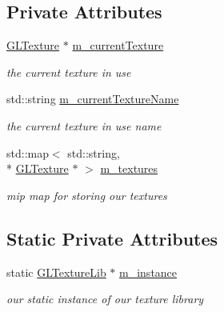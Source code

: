 \subsection*{Private Attributes}
\begin{DoxyCompactItemize}
\item 
\hypertarget{class_g_l_texture_lib_a148bbba73a37d5478e1f037699f51d94}{\hyperlink{class_g_l_texture}{G\-L\-Texture} $\ast$ \hyperlink{class_g_l_texture_lib_a148bbba73a37d5478e1f037699f51d94}{m\-\_\-current\-Texture}}\label{class_g_l_texture_lib_a148bbba73a37d5478e1f037699f51d94}

\begin{DoxyCompactList}\small\item\em the current texture in use \end{DoxyCompactList}\item 
\hypertarget{class_g_l_texture_lib_a931a6e49b5a86564de11359436dfb745}{std\-::string \hyperlink{class_g_l_texture_lib_a931a6e49b5a86564de11359436dfb745}{m\-\_\-current\-Texture\-Name}}\label{class_g_l_texture_lib_a931a6e49b5a86564de11359436dfb745}

\begin{DoxyCompactList}\small\item\em the current texture in use name \end{DoxyCompactList}\item 
\hypertarget{class_g_l_texture_lib_adbacf6d620b239b381e955ef4277a6a6}{std\-::map$<$ std\-::string, \\*
\hyperlink{class_g_l_texture}{G\-L\-Texture} $\ast$ $>$ \hyperlink{class_g_l_texture_lib_adbacf6d620b239b381e955ef4277a6a6}{m\-\_\-textures}}\label{class_g_l_texture_lib_adbacf6d620b239b381e955ef4277a6a6}

\begin{DoxyCompactList}\small\item\em mip map for storing our textures \end{DoxyCompactList}\end{DoxyCompactItemize}
\subsection*{Static Private Attributes}
\begin{DoxyCompactItemize}
\item 
\hypertarget{class_g_l_texture_lib_a54710e7dffef1a0d7e383802298c5c3a}{static \hyperlink{class_g_l_texture_lib}{G\-L\-Texture\-Lib} $\ast$ \hyperlink{class_g_l_texture_lib_a54710e7dffef1a0d7e383802298c5c3a}{m\-\_\-instance}}\label{class_g_l_texture_lib_a54710e7dffef1a0d7e383802298c5c3a}

\begin{DoxyCompactList}\small\item\em our static instance of our texture library \end{DoxyCompactList}\end{DoxyCompactItemize}


